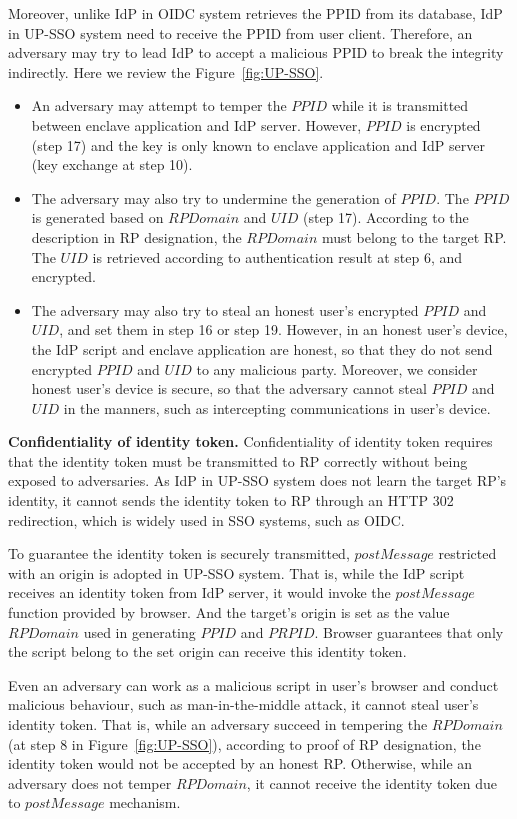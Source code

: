 Moreover, unlike IdP in OIDC system retrieves the PPID from its database, IdP in UP-SSO system need to receive the PPID from user client. Therefore, an adversary may try to lead IdP to accept a malicious PPID to break the integrity indirectly. 
Here we review the Figure~\ref{fig:UP-SSO}. 
\begin{itemize}
\item An adversary may attempt to temper the $PPID$ while it is transmitted between enclave application and IdP server. However, $PPID$ is encrypted (step 17) and the key is only known to enclave application and IdP server (key exchange at step 10).
\item The adversary may also try to undermine the generation of $PPID$. 
The $PPID$ is generated based on $RPDomain$ and $UID$ (step 17). According to the description in RP designation, the $RPDomain$ must belong to the target RP. The $UID$ is retrieved according to authentication result at step 6, and encrypted.
\item The adversary may also try to steal an honest user's encrypted $PPID$ and $UID$, and set them in step 16 or step 19. However, in an honest user's device, the IdP script and enclave application are honest, so that they do not send encrypted $PPID$ and $UID$ to any malicious party. Moreover, we consider honest user's device is secure, so that the adversary cannot steal $PPID$ and $UID$ in the manners, such as intercepting communications in user's device.
\end{itemize}


\vspace{3mm}\noindent\textbf{Confidentiality of identity token.}
Confidentiality of identity token requires that the identity token must be transmitted to RP correctly without being exposed to adversaries.
As IdP in UP-SSO system does not learn the target RP's identity, it cannot sends the identity token to RP through an HTTP 302 redirection, which is widely used in SSO systems, such as OIDC. 

To guarantee the identity token is securely transmitted, $postMessage$ restricted with an origin is adopted in UP-SSO system. That is, while the IdP script receives an identity token from IdP server, it would invoke the $postMessage$ function provided by browser. And the target's origin is set as the value $RPDomain$ used in generating $PPID$ and $PRPID$. Browser guarantees that only the script belong to the set origin can receive this identity token.

Even an adversary can work as a malicious script in user's browser and conduct malicious behaviour, such as man-in-the-middle attack, it cannot steal user's identity token. That is, while an adversary succeed in tempering the $RPDomain$ (at step 8 in Figure~\ref{fig:UP-SSO}), according to proof of RP designation, the identity token would not be accepted by an honest RP. Otherwise, while an adversary does not temper $RPDomain$, it cannot receive the identity token due to $postMessage$ mechanism.



